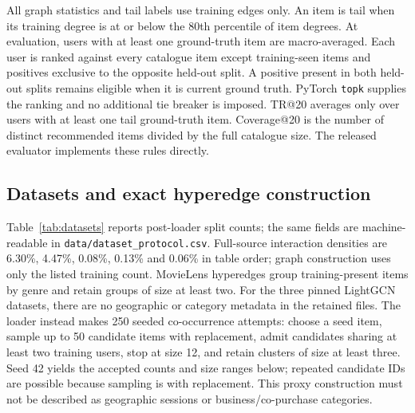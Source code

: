 \documentclass[a4paper,fleqn,longmktitle]{cas-dc}
\begin{document}
All graph statistics and tail labels use training edges only. An item is tail
when its training degree is at or below the 80th percentile of item degrees.
At evaluation, users with at least one ground-truth item are macro-averaged.
Each user is ranked against every catalogue item except training-seen items
and positives exclusive to the opposite held-out split. A positive present in
both held-out splits remains eligible when it is current ground truth. PyTorch
\texttt{topk} supplies the ranking and no additional tie breaker is imposed.
TR@20 averages only over users with at least one tail ground-truth item.
Coverage@20 is the number of distinct recommended items divided by the full
catalogue size. The released evaluator implements these rules directly.

\subsection{Datasets and exact hyperedge construction}
\label{sec:datasets}

Table~\ref{tab:datasets} reports post-loader split counts; the same fields are
machine-readable in \texttt{data/dataset\_protocol.csv}. Full-source
interaction densities are 6.30\%, 4.47\%, 0.08\%, 0.13\% and 0.06\% in table
order; graph construction uses only the listed training count. MovieLens hyperedges group training-present items by genre and
retain groups of size at least two. For the three pinned LightGCN datasets,
there are no geographic or category metadata in the retained files. The loader
instead makes 250 seeded co-occurrence attempts: choose a seed item, sample up
to 50 candidate items with replacement, admit candidates sharing at least two
training users, stop at size 12, and retain clusters of size at least three.
Seed 42 yields the accepted counts and size ranges below; repeated candidate
IDs are possible because sampling is with replacement. This proxy construction
must not be described as geographic sessions or business/co-purchase
categories.
\end{document}
